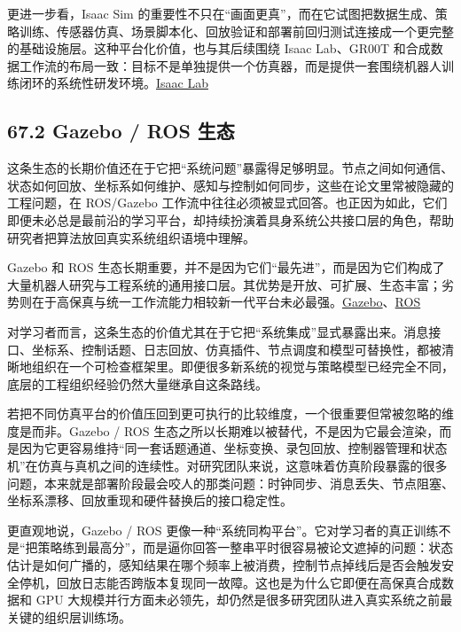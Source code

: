 更进一步看，Isaac Sim 的重要性不只在“画面更真”，而在它试图把数据生成、策略训练、传感器仿真、场景脚本化、回放验证和部署前回归测试连接成一个更完整的基础设施层。这种平台化价值，也与其后续围绕 Isaac Lab、GR00T 和合成数据工作流的布局一致：目标不是单独提供一个仿真器，而是提供一套围绕机器人训练闭环的系统性研发环境。\href{https://isaac-sim.github.io/IsaacLab/}{Isaac Lab}

\subsection*{67.2 Gazebo / ROS 生态}


这条生态的长期价值还在于它把“系统问题”暴露得足够明显。节点之间如何通信、状态如何回放、坐标系如何维护、感知与控制如何同步，这些在论文里常被隐藏的工程问题，在 ROS/Gazebo 工作流中往往必须被显式回答。也正因为如此，它们即便未必总是最前沿的学习平台，却持续扮演着具身系统公共接口层的角色，帮助研究者把算法放回真实系统组织语境中理解。

Gazebo 和 ROS 生态长期重要，并不是因为它们“最先进”，而是因为它们构成了大量机器人研究与工程系统的通用接口层。其优势是开放、可扩展、生态丰富；劣势则在于高保真与统一工作流能力相较新一代平台未必最强。\href{https://gazebosim.org/home}{Gazebo}、\href{https://www.ros.org/}{ROS}

对学习者而言，这条生态的价值尤其在于它把“系统集成”显式暴露出来。消息接口、坐标系、控制话题、日志回放、仿真插件、节点调度和模型可替换性，都被清晰地组织在一个可检查框架里。即便很多新系统的视觉与策略模型已经完全不同，底层的工程组织经验仍然大量继承自这条路线。

若把不同仿真平台的价值压回到更可执行的比较维度，一个很重要但常被忽略的维度是\texttt{}而非\texttt{}。Gazebo / ROS 生态之所以长期难以被替代，不是因为它最会渲染，而是因为它更容易维持“同一套话题通道、坐标变换、录包回放、控制器管理和状态机”在仿真与真机之间的连续性。对研究团队来说，这意味着仿真阶段暴露的很多问题，本来就是部署阶段最会咬人的那类问题：时钟同步、消息丢失、节点阻塞、坐标系漂移、回放重现和硬件替换后的接口稳定性。

更直观地说，Gazebo / ROS 更像一种“系统同构平台”。它对学习者的真正训练不是“把策略练到最高分”，而是逼你回答一整串平时很容易被论文遮掉的问题：状态估计是如何广播的，感知结果在哪个频率上被消费，控制节点掉线后是否会触发安全停机，回放日志能否跨版本复现同一故障。这也是为什么它即便在高保真合成数据和 GPU 大规模并行方面未必领先，却仍然是很多研究团队进入真实系统之前最关键的组织层训练场。


